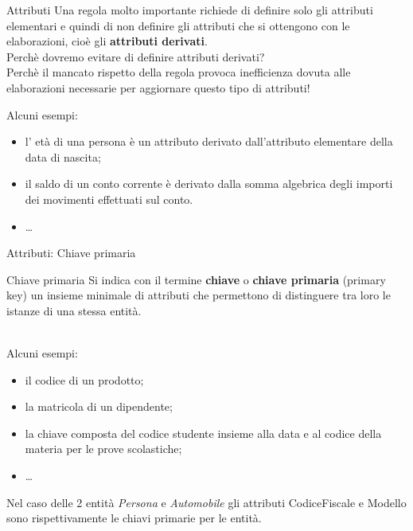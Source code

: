 %
\begin{frame}{Attributi}
Una regola molto importante  richiede di definire solo gli attributi elementari e quindi di non definire gli attributi che si ottengono con le elaborazioni, cio\`e gli \textbf{attributi derivati}.
\pause
\newline
\\Perch\`e dovremo evitare di definire attributi derivati?
\pause
\newline
\\Perch\`e il mancato rispetto della regola provoca inefficienza dovuta alle elaborazioni necessarie per aggiornare questo tipo di attributi!
\pause

Alcuni esempi:
\begin{itemize}
    \item l' et\`a di una persona \`e un attributo derivato dall'attributo elementare della data di nascita;
    \item il saldo di un conto corrente \`e derivato dalla somma algebrica degli importi dei movimenti effettuati sul conto.
    \item \ldots
\end{itemize}
\end{frame}
%
\begin{frame}{Attributi: Chiave primaria}
\vspace{-.9cm}

\begin{minipage}{0.9\textwidth}
\begin{block}{Chiave primaria}
Si indica con il termine \textbf{chiave} o \textbf{chiave primaria} (primary key) un insieme minimale di attributi che permettono di distinguere tra loro le istanze di una stessa entit\`a.
\end{block}
\end{minipage}
\pause
\newline
\\Alcuni esempi:
\begin{itemize}[<+->]
    \item il codice di un prodotto;
    \item la matricola di un dipendente;
    \item la chiave composta del codice studente insieme alla data e al codice della materia per le prove scolastiche;
    \item \ldots
\end{itemize}
\pause

Nel caso delle 2 entit\`a \textit{Persona} e \textit{Automobile} gli attributi CodiceFiscale e Modello sono rispettivamente le chiavi primarie per le entit\`a.
\end{frame}

